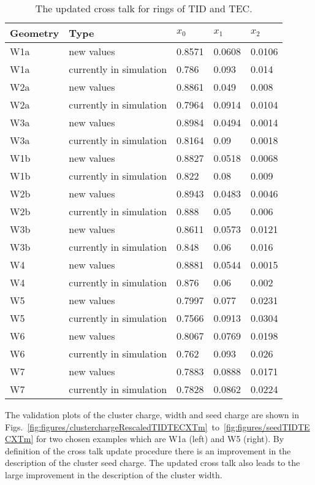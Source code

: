 \begin{table}[h]
\begin{center}
\begin{tabular}{|l|l|l|l|l|}
\hline
Geometry & Type & $x_{0}$ & $x_{1}$ & $x_{2}$ \\
\hline
\hline
W1a &  new values & 0.8571 & 0.0608 & 0.0106 \\
W1a &  currently in simulation & 0.786 & 0.093 & 0.014 \\
\hline
W2a &  new values & 0.8861 & 0.049 & 0.008 \\
W2a &  currently in simulation & 0.7964 & 0.0914 & 0.0104 \\
\hline
W3a &  new values & 0.8984 & 0.0494 & 0.0014 \\
W3a &  currently in simulation & 0.8164 & 0.09 & 0.0018 \\
\hline
W1b &  new values & 0.8827 & 0.0518 & 0.0068 \\
W1b &  currently in simulation & 0.822 & 0.08 & 0.009 \\
\hline
W2b &  new values & 0.8943 & 0.0483 & 0.0046 \\
W2b &  currently in simulation & 0.888 & 0.05 & 0.006 \\
\hline
W3b &  new values & 0.8611 & 0.0573 & 0.0121 \\
W3b &  currently in simulation & 0.848 & 0.06 & 0.016 \\
\hline
W4 &  new values & 0.8881 & 0.0544 & 0.0015 \\
W4 &  currently in simulation & 0.876 & 0.06 & 0.002 \\
\hline
W5 &  new values & 0.7997 & 0.077 & 0.0231 \\
W5 &  currently in simulation & 0.7566 & 0.0913 & 0.0304 \\
\hline
W6 &  new values & 0.8067 & 0.0769 & 0.0198 \\
W6 &  currently in simulation & 0.762 & 0.093 & 0.026 \\
\hline
W7 &  new values & 0.7883 & 0.0888 & 0.0171 \\
W7 &  currently in simulation & 0.7828 & 0.0862 & 0.0224 \\
\hline
\end{tabular}
\caption[Table caption text]{The updated cross talk for rings of TID and TEC. }
\label{tab:measuredXtalkTODTEC}
\end{center}
\end{table}


The validation plots of the cluster charge, width and seed charge are shown in Figs.~\ref{fig:figures/clusterchargeRescaledTIDTECXTm}~to~\ref{fig:figures/seedTIDTECXTm} for two chosen examples which are W1a (left) and W5 (right). By definition of the cross talk update procedure there is an improvement in the description of the cluster seed charge. The updated cross talk also leads to the large improvement in the description of the cluster width.

